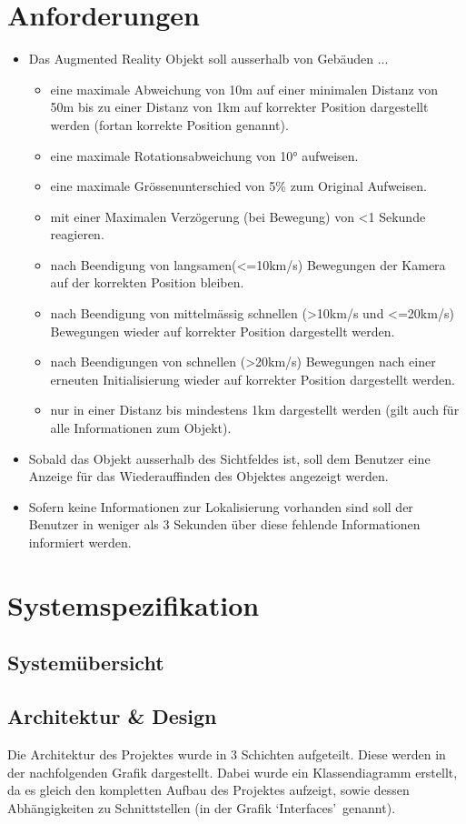 \documentclass[a4paper]{scrreprt}
\begin{document}
\section{Anforderungen}
\begin{itemize}
	\item Das Augmented Reality Objekt soll ausserhalb von Gebäuden ...
	\begin{itemize}
		\item eine maximale Abweichung von 10m auf einer minimalen Distanz von 50m bis zu einer Distanz von 1km auf korrekter Position dargestellt werden (fortan korrekte Position genannt).
		\item eine maximale Rotationsabweichung von \ang{10} aufweisen.
		\item eine maximale Grössenunterschied von 5\% zum Original Aufweisen.
		\item mit einer Maximalen Verzögerung (bei Bewegung) von <1 Sekunde reagieren.
		\item nach Beendigung von langsamen(<=10km/s) Bewegungen der Kamera auf der korrekten Position bleiben.
		\item nach Beendigung von mittelmässig schnellen (>10km/s und <=20km/s) Bewegungen wieder auf korrekter Position dargestellt werden.
		\item nach Beendigungen von schnellen (>20km/s) Bewegungen nach einer erneuten Initialisierung wieder auf korrekter Position dargestellt werden.
		\item nur in einer Distanz bis mindestens 1km dargestellt werden (gilt auch für alle Informationen zum Objekt).
	\end{itemize}
	\item Sobald das Objekt ausserhalb des Sichtfeldes ist, soll dem Benutzer eine Anzeige für das Wiederauffinden des Objektes angezeigt werden.
	\item Sofern keine Informationen zur Lokalisierung vorhanden sind soll der Benutzer in weniger als 3 Sekunden über diese fehlende Informationen informiert werden.
\end{itemize}
\section{Systemspezifikation}

\subsection{Systemübersicht}

\subsection{Architektur \& Design}
Die Architektur des Projektes wurde in 3 Schichten aufgeteilt. Diese werden in der nachfolgenden Grafik dargestellt. Dabei wurde ein Klassendiagramm erstellt, da es gleich den kompletten Aufbau des Projektes aufzeigt, sowie dessen Abhängigkeiten zu Schnittstellen (in der Grafik \textquoteleft Interfaces\textquoteright\ genannt).
\end{document}
